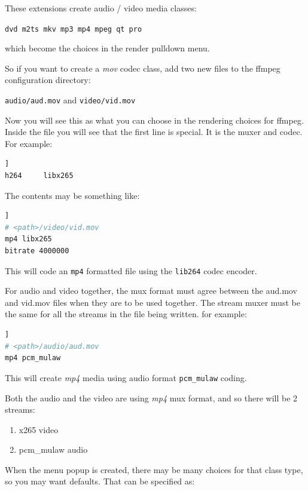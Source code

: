 These extensions create audio / video media classes:

\texttt{dvd \quad  m2ts \quad  mkv \quad  mp3 \quad  mp4 \quad  mpeg  \quad qt \quad  pro}

which become the choices in the render pulldown menu.

So if you want to create a \textit{mov} codec class, add two new files to the ffmpeg configuration directory:

\texttt{audio/aud.mov}  and  \texttt{video/vid.mov}

Now you will see this as what you can choose in the rendering choices for ffmpeg.
Inside the file you will see that the first line is special.  It is the muxer and codec.  For example:

\begin{lstlisting}[language=bash,numbers=none]]
h264     libx265
\end{lstlisting}

The contents may be something like:

\begin{lstlisting}[language=bash,numbers=none]]
# <path>/video/vid.mov 
mp4 libx265
bitrate 4000000
\end{lstlisting}

This will code an \texttt{mp4} formatted file using the \texttt{lib264} codec encoder.

For audio and video together, the mux format must agree between the aud.mov and vid.mov files when they are to be used together.  The stream muxer must be the same for all the streams in the file being written.
for example:

\begin{lstlisting}[language=bash,numbers=none]]
# <path>/audio/aud.mov
mp4 pcm_mulaw
\end{lstlisting}

This will create \textit{mp4} media using audio format \texttt{pcm\_mulaw} coding.

Both the audio and the video are using \textit{mp4} mux format, and so there will be 2 streams:
\begin{enumerate}
    \item x265 video
    \item pcm\_mulaw audio
\end{enumerate}

When the menu popup is created, there may be many choices for that class type, so you may want defaults.  That can be specified as:

